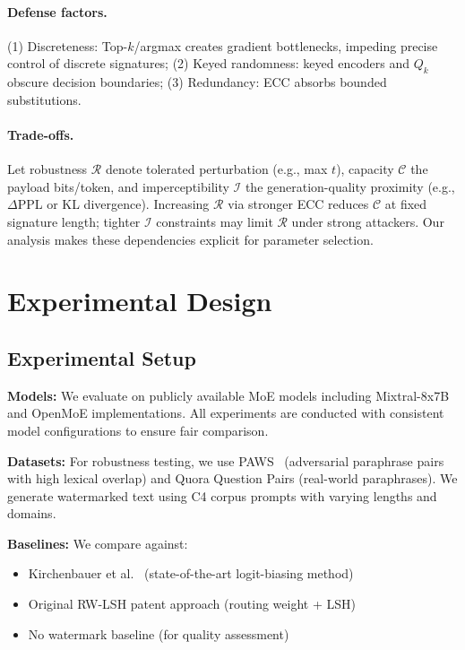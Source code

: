 \paragraph{Defense factors.} (1) Discreteness: Top-$k$/argmax creates gradient bottlenecks, impeding precise control of discrete signatures; (2) Keyed randomness: keyed encoders and $Q_k$ obscure decision boundaries; (3) Redundancy: ECC absorbs bounded substitutions.

\paragraph{Trade-offs.} Let robustness $\mathcal{R}$ denote tolerated perturbation (e.g., max $t$), capacity $\mathcal{C}$ the payload bits/token, and imperceptibility $\mathcal{I}$ the generation-quality proximity (e.g., $\Delta$PPL or KL divergence). Increasing $\mathcal{R}$ via stronger ECC reduces $\mathcal{C}$ at fixed signature length; tighter $\mathcal{I}$ constraints may limit $\mathcal{R}$ under strong attackers. Our analysis makes these dependencies explicit for parameter selection.

\section{Experimental Design}

\subsection{Experimental Setup}

\textbf{Models:} We evaluate on publicly available MoE models including Mixtral-8x7B and OpenMoE implementations. All experiments are conducted with consistent model configurations to ensure fair comparison.

\textbf{Datasets:} For robustness testing, we use PAWS~\cite{zhang2019paws} (adversarial paraphrase pairs with high lexical overlap) and Quora Question Pairs (real-world paraphrases). We generate watermarked text using C4 corpus prompts with varying lengths and domains.

\textbf{Baselines:} We compare against:
\begin{itemize}
\item Kirchenbauer et al.~\cite{kirchenbauer2023watermark} (state-of-the-art logit-biasing method)
\item Original RW-LSH patent approach (routing weight + LSH)
\item No watermark baseline (for quality assessment)
\end{itemize}

